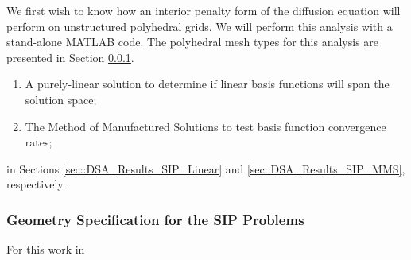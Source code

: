 We first wish to know how an interior penalty form of the diffusion equation will perform on unstructured polyhedral grids. We will perform this analysis with a stand-alone MATLAB code. The polyhedral mesh types for this analysis are presented in Section \ref{sec::DSA_Results_SIP_Geometry}. 

\begin{enumerate}
	\item A purely-linear solution to determine if linear basis functions will span the solution space;
	\item The Method of Manufactured Solutions to test basis function convergence rates;
\end{enumerate}

\noindent in Sections \ref{sec::DSA_Results_SIP_Linear} and \ref{sec::DSA_Results_SIP_MMS}, respectively. 

\subsubsection{Geometry Specification for the SIP Problems}
\label{sec::DSA_Results_SIP_Geometry}

For this work in

